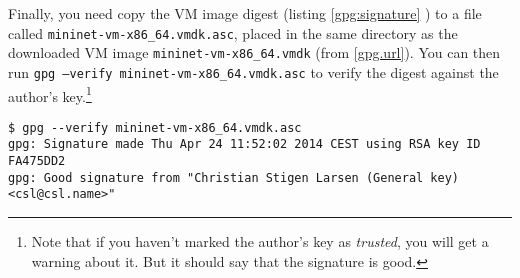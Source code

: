 Finally, you need copy the VM image digest (listing \ref{gpg:signature}
) to a file called
\texttt{mininet-vm-x86\_{}64.vmdk.asc}, placed in the same directory as the
downloaded VM image \texttt{mininet-vm-x86\_{}64.vmdk} (from \vref{gpg.url}).
You can then run \texttt{gpg --verify mininet-vm-x86\_{}64.vmdk.asc} to verify
the digest against the author's key.\footnote{Note that if you haven't
marked the author's key as \textit{trusted}, you will get a warning about
it.  But it should say that the signature is good.}

\begin{Verbatim}
$ gpg --verify mininet-vm-x86_64.vmdk.asc
gpg: Signature made Thu Apr 24 11:52:02 2014 CEST using RSA key ID FA475DD2
gpg: Good signature from "Christian Stigen Larsen (General key) <csl@csl.name>"
\end{Verbatim}



